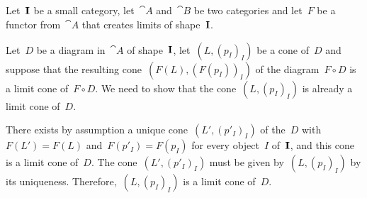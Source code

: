 \subsection{}

Let~$\mathbf{I}$ be a small category, let~$\cat{A}$ and~$\cat{B}$ be two categories and let~$F$ be a functor from~$\cat{A}$ that creates limits of shape~$\mathbf{I}$.

Let~$D$ be a diagram in~$\cat{A}$ of shape~$\mathbf{I}$, let~$(L, (p_I)_I)$ be a cone of~$D$ and suppose that the resulting cone~$(F(L), (F(p_I))_I)$ of the diagram~$F ∘ D$ is a limit cone of~$F ∘ D$.
We need to show that the cone~$(L, (p_I)_I)$ is already a limit cone of~$D$.

There exists by assumption a unique cone~$(L', (p'_I)_I)$ of the~$D$ with~$F(L') = F(L)$ and~$F(p'_I) = F(p_I)$ for every object~$I$ of~$\mathbf{I}$, and this cone is a limit cone of~$D$.
The cone~$(L', (p'_I)_I)$ must be given by~$(L, (p_I)_I)$ by its uniqueness.
Therefore,~$(L, (p_I)_I)$ is a limit cone of~$D$.
